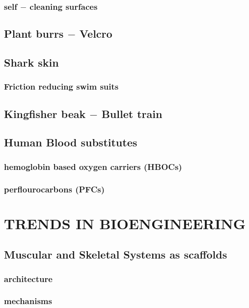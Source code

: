 \documentclass{article}
\begin{document}
	\subsubsection{self $-$ cleaning surfaces}

	\subsection{Plant burrs $-$ Velcro}

	\subsection{Shark skin}
	\subsubsection{Friction reducing swim suits}

	\subsection{Kingfisher beak $-$ Bullet train}

	\subsection{Human Blood substitutes}
	\subsubsection{hemoglobin based oxygen carriers (HBOCs)}
	\subsubsection{perflourocarbons (PFCs)}
	\newpage

	\section{TRENDS IN BIOENGINEERING}
	\subsection{Muscular and Skeletal Systems as scaffolds}
	\subsubsection{architecture}
	\subsubsection{mechanisms}
\end{document}
